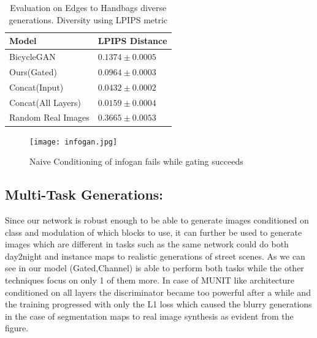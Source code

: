 \begin{table}[ht]
\caption{Evaluation on Edges to Handbags diverse generations. Diversity using LPIPS metric \cite{zhang2018unreasonable}} %
\small
\centering %
\begin{tabular}{p{3cm}p{3cm}} %
\toprule
\textbf{Model} & \textbf{LPIPS Distance} \\%
\midrule
BicycleGAN \cite{zhu2017toward} & $0.1374 \pm 0.0005$  \\ %
\midrule
Ours(Gated) & $0.0964 \pm 0.0003$  \\
\midrule
Concat(Input) &  $0.0432 \pm 0.0002$ \\
\midrule
Concat(All Layers) & $0.0159 \pm 0.0004$ \\
\midrule
Random Real Images & $0.3665 \pm 0.0053$ \\
\bottomrule %
\end{tabular}
\label{table:infogan_lpips} %
\end{table}


\begin{figure}
    \centering
    \texttt{[image: infogan.jpg]}
    \caption{Naive Conditioning of infogan fails while gating succeeds}\label{fig:infogan_gate}
    \vspace{-4mm}
\end{figure}

\subsection{Multi-Task Generations: }
Since our network is robust enough to be able to generate images conditioned on class and modulation of which blocks to use, it can further be used to generate images which are different in tasks such as the same network could do both day2night and instance maps to realistic generations of street scenes. As we can see in  our model (Gated,Channel) is able to perform both tasks while the other techniques focus on only 1 of them more. In case of MUNIT like architecture conditioned on all layers the discriminator became too powerful after a while and the training progressed with only the L1 loss which caused the blurry generations in the case of segmentation maps to real image synthesis as evident from the figure.


